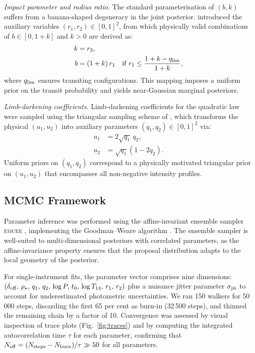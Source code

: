 \documentclass[fleqn,usenatbib]{mnras}
\newcommand{\rhostar}{\rho_{\star}}
\newcommand{\emcee}{\textsc{emcee}}
\begin{document}
\textit{Impact parameter and radius ratio.} The standard parameterisation of $(b, k)$ suffers from a banana-shaped degeneracy in the joint posterior. \citet{espinoza2018} introduced the auxiliary variables $(r_1, r_2) \in [0,1]^2$, from which physically valid combinations of $b \in [0, 1+k]$ and $k > 0$ are derived as:
\begin{align}
  \label{eq:espinoza}
  k &= r_2,\\
  b &= (1 + k)\,r_1 \quad \text{if } r_1 \leq \frac{1+k-q_{\rm lim}}{1+k}, \nonumber
\end{align}
where $q_{\rm lim}$ ensures transiting configurations. This mapping imposes a uniform prior on the transit probability and yields near-Gaussian marginal posteriors.

\textit{Limb-darkening coefficients.} Limb-darkening coefficients for the quadratic law were sampled using the triangular sampling scheme of \citet{kipping2013}, which transforms the physical $(u_1, u_2)$ into auxiliary parameters $(q_1, q_2) \in [0,1]^2$ via:
\begin{align}
  \label{eq:kipping}
  u_1 &= 2\sqrt{q_1}\,q_2,\\
  u_2 &= \sqrt{q_1}(1 - 2q_2). \nonumber
\end{align}
Uniform priors on $(q_1, q_2)$ correspond to a physically motivated triangular prior on $(u_1, u_2)$ that encompasses all non-negative intensity profiles.

\subsection{MCMC Framework}
\label{sec:mcmc}

Parameter inference was performed using the affine-invariant ensemble sampler \emcee{} \citep{foremanmackey2013}, implementing the Goodman--Weare algorithm \citep{hastings1970}. The ensemble sampler is well-suited to multi-dimensional posteriors with correlated parameters, as the affine-invariance property ensures that the proposal distribution adapts to the local geometry of the posterior.

For single-instrument fits, the parameter vector comprises nine dimensions: $(\delta_{\rm off},\, \rhostar,\, q_1,\, q_2,\, \log P,\, t_0,\, \log T_{14},\, r_1,\, r_2)$ plus a nuisance jitter parameter $\sigma_{\rm jit}$ to account for underestimated photometric uncertainties. We ran 150 walkers for 50\,000 steps, discarding the first 65 per cent as burn-in (32\,500 steps), and thinned the remaining chain by a factor of 10. Convergence was assessed by visual inspection of trace plots (Fig.~\ref{fig:traces}) and by computing the integrated autocorrelation time $\tau$ for each parameter, confirming that $N_{\rm eff} = (N_{\rm steps} - N_{\rm burn})/\tau \gg 50$ for all parameters.
\end{document}
